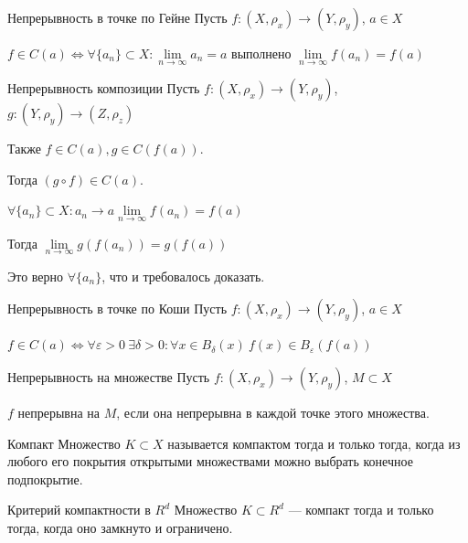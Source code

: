\begin{defn}{Непрерывность в точке по Гейне}{}
    Пусть \( f : (X, \rho_x) \to (Y, \rho_y) \), \( a \in X \)

    \( f \in C(a) \Leftrightarrow \forall \{ a_n \} \subset X : \lim\limits_{n \to \infty} a_n = a \)
    выполнено \( \lim\limits_{n \to \infty} f(a_n) = f(a) \)
\end{defn}

\begin{thrm}{Непрерывность композиции}{}
    Пусть \( f : (X, \rho_x) \to (Y, \rho_y) \), \( g : (Y, \rho_y) \to (Z, \rho_z) \)

    Также \( f \in C(a), g \in C(f(a)) \).

    Тогда \( (g \circ f) \in C(a) \).
\end{thrm}

\( \forall \{ a_n \} \subset X : a_n \to a \lim\limits_{n \to \infty} f(a_n) = f(a) \)

Тогда \( \lim\limits_{n \to \infty} g(f(a_n)) = g(f(a)) \)

Это верно \( \forall \{ a_n \} \), что и требовалось доказать.

\begin{defn}{Непрерывность в точке по Коши}{}
    Пусть \( f : (X, \rho_x) \to (Y, \rho_y) \), \( a \in X \)

    \( f \in C(a) \Leftrightarrow \forall \varepsilon > 0 \: \exists \delta > 0 : \forall x \in B_{\delta} (x) \: f(x) \in B_{\varepsilon} (f(a)) \)
\end{defn}

\begin{defn}{Непрерывность на множестве}{}
    Пусть \( f : (X, \rho_x) \to (Y, \rho_y) \), \( M \subset X \)

    \( f \) непрерывна на \( M \),
    если она непрерывна в каждой точке этого множества.
\end{defn}

\begin{defn}{Компакт}{}
    Множество \( K \subset X \) называется компактом тогда и только тогда,
    когда из любого его покрытия открытыми множествами можно выбрать конечное подпокрытие.
\end{defn}

\begin{thrm}{Критерий компактности в \( R^d \)}{}
    Множество \( K \subset R^d \) --- компакт тогда и только тогда,
    когда оно замкнуто и ограничено.
\end{thrm}

